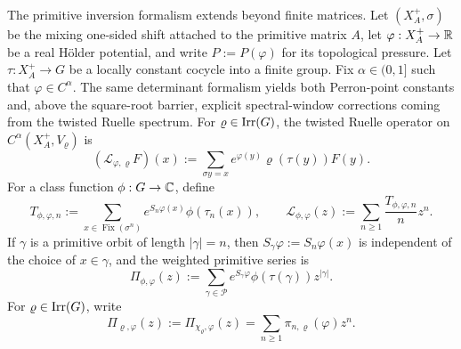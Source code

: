 The primitive inversion formalism extends beyond finite matrices. Let
\((X_A^+,\sigma)\) be the mixing one-sided shift attached to the
primitive matrix \(A\), let \(\varphi:X_A^+\to\mathbb{R}\) be a real
H\"older potential, and write \(P:=P(\varphi)\) for its topological
pressure. Let \(\tau:X_A^+\to G\) be a locally constant cocycle into a
finite group. Fix \(\alpha\in(0,1]\) such that \(\varphi\in C^\alpha\).
The same determinant formalism yields both Perron-point constants and,
above the square-root barrier, explicit spectral-window corrections
coming from the twisted Ruelle spectrum.
For \(\varrho\in\operatorname{Irr}(G)\), the twisted Ruelle operator on
\(C^\alpha(X_A^+,V_\varrho)\) is
\[
  (\mathscr L_{\varphi,\varrho}F)(x)
  :=
  \sum_{\sigma y=x}e^{\varphi(y)}\varrho(\tau(y))F(y).
\]
For a class function \(\phi:G\to\mathbb{C}\), define
\[
  T_{\phi,\varphi,n}
  :=
  \sum_{x\in\operatorname{Fix}(\sigma^n)}
    e^{S_n\varphi(x)}\phi(\tau_n(x)),
  \qquad
  \mathcal L_{\phi,\varphi}(z)
  :=
  \sum_{n\ge 1}\frac{T_{\phi,\varphi,n}}{n}z^n.
\]
If \(\gamma\) is a primitive orbit of length \(|\gamma|=n\), then
\(S_\gamma\varphi:=S_n\varphi(x)\) is independent of the choice of
\(x\in\gamma\), and the weighted primitive series is
\[
  \Pi_{\phi,\varphi}(z)
  :=
  \sum_{\gamma\in\mathcal P}
    e^{S_\gamma\varphi}\phi(\tau(\gamma))z^{|\gamma|}.
\]
For \(\varrho\in\operatorname{Irr}(G)\), write
\[
  \Pi_{\varrho,\varphi}(z):=\Pi_{\chi_\varrho,\varphi}(z)
  =\sum_{n\ge 1}\pi_{n,\varrho}(\varphi)z^n.
\]

